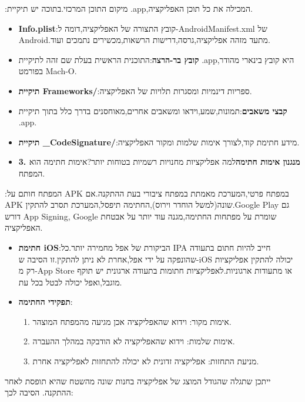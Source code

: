 
:מיקום התוכן המרכזי.בתוכה יש תיקיית .app,המכילה את כל תוכן האפליקציה.

\begin{itemize}
  \item \textbf{Info.plist}:קובץ התצורה של האפליקציה,דומה ל-AndroidManifest.xml של Android.מתעד מזהה אפליקציה,גרסה,דרישות הרשאות,מכשירים נתמכים ועוד.
  \item \textbf{קובץ בר-הרצה}:התוכנית הראשית בעלת שם זהה לתיקיית .app,היא קובץ בינארי מהודר בפורמט Mach-O.
  \item \textbf{תיקיית Frameworks/}:ספריות דינמיות ומסגרות תלויות של האפליקציה.
  \item \textbf{קבצי משאבים}:תמונות,שמע,וידאו ומשאבים אחרים,מאוחסנים בדרך כלל בתוך תיקיית .app.
  \item \textbf{תיקיית \_CodeSignature/}:מידע חתימת קוד,לצורך אימות שלמות ומקור האפליקציה.
  \item \textbf{3. מנגנון אימות חתימה}למה אפליקציות מחנויות רשמיות בטוחות יותר?אימות חתימה הוא המפתח.
\end{itemize}


:המפתח חותם על APK במפתח פרטי,המערכת מאמתת במפתח ציבורי בעת ההתקנה.אם APK שונה(למשל הוחדר וירוס),החתימה תיפסל,המערכת תסרב להתקין.Google Play גם דורש App Signing, Google שומרת על מפתחות החתימה,מגנה עוד יותר על אבטחת האפליקציה.

\begin{itemize}
  \item \textbf{חתימת iOS}:הביקורת של אפל מחמירה יותר.כל IPA חייב להיות חתום בתעודה שהונפקה על ידי אפל,אחרת לא ניתן להתקין.זו הסיבה ש-iOS יכולה להתקין אפליקציות רק מ-App Store או מתעודות ארגוניות.לאפליקציות חתומות בתעודה ארגונית יש תוקף מוגבל,ואפל יכולה לבטל בכל עת.
  \item \textbf{תפקידי החתימה}:
  \begin{enumerate}
    \item אימות מקור: וידוא שהאפליקציה אכן מגיעה מהמפתח המוצהר.
    \item אימות שלמות: וידוא שהאפליקציה לא הודבקה במהלך ההעברה.
    \item מניעת התחזות: אפליקציה זדונית לא יכולה להתחזות לאפליקציה אחרת.
  \end{enumerate}
\end{itemize}


ייתכן שתגלה שהגודל המוצג של אפליקציה בחנות שונה מהשטח שהיא תופסת לאחר ההתקנה. הסיבה לכך:

